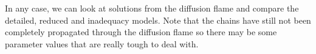In any case, we can look at solutions from the diffusion flame and compare 
the detailed, reduced and inadequacy models.  Note that the chains have 
still not been completely propagated through the diffusion flame so there 
may be some parameter values that are really tough to deal with.


































